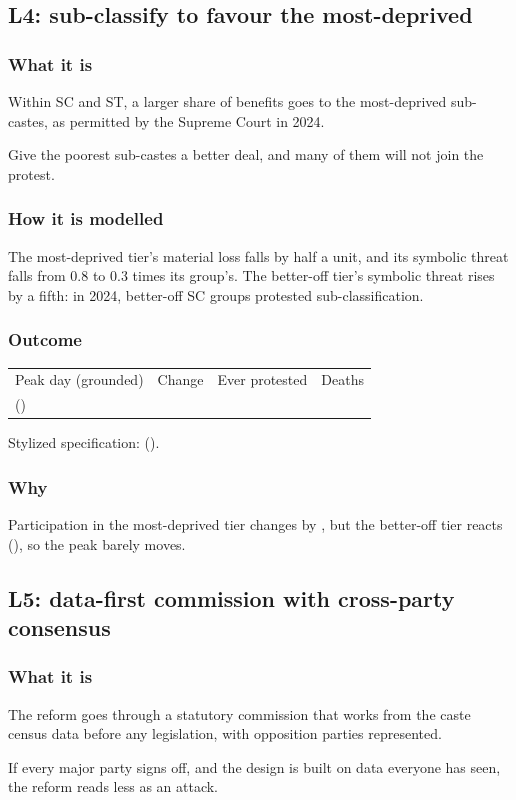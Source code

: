 \documentclass[11pt,a4paper]{article}
\makeatletter
\newcommand{\outcomeline}[6]{%
  \begin{tabular}{@{}llll@{}}
  \sffamily\small\color{muted}Peak day (grounded) & \sffamily\small\color{muted}Change & \sffamily\small\color{muted}Ever protested & \sffamily\small\color{muted}Deaths\\
  \textbf{#1} \small(#2) & \textbf{#3} & #4 & #5\\
  \end{tabular}\par\smallskip
  {\small\color{muted}Stylized specification: #6}\par}
\makeatother
\begin{document}
\subsection{L4: sub-classify to favour the most-deprived}
\subsubsection{What it is}
Within SC and ST, a larger share of benefits goes to the most-deprived sub-castes, as permitted by the Supreme Court in 2024.
\begin{plainwords}Give the poorest sub-castes a better deal, and many of them will not join the protest.\end{plainwords}
\subsubsection{How it is modelled}
The most-deprived tier's material loss falls by half a unit, and its symbolic threat falls from 0.8 to 0.3 times its group's. The better-off tier's symbolic threat rises by a fifth: in 2024, better-off SC groups protested sub-classification.
\subsubsection{Outcome}
\outcomeline{\PeakGroundedSubClassification}{\PeakRangeGroundedSubClassification}{\PeakChangeGroundedSubClassification}{\CumulativeGroundedSubClassification}{\DeathsGroundedSubClassification}{\PeakCentralSubClassification{} (\PeakChangeCentralSubClassification).}
\subsubsection{Why}
Participation in the most-deprived tier changes by \FactDeprivedChange, but the better-off tier reacts (\FactBetterOffChange), so the peak barely moves.

\subsection{L5: data-first commission with cross-party consensus}
\subsubsection{What it is}
The reform goes through a statutory commission that works from the caste census data before any legislation, with opposition parties represented.
\begin{plainwords}If every major party signs off, and the design is built on data everyone has seen, the reform reads less as an attack.\end{plainwords}
\end{document}
